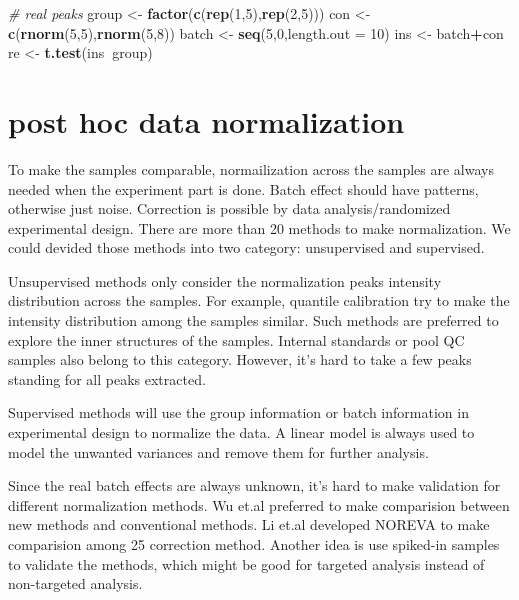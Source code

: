 \documentclass[
]{book}
\newenvironment{Shaded}{\begin{snugshade}}{\end{snugshade}}
\newcommand{\CommentTok}[1]{\textcolor[rgb]{0.56,0.35,0.01}{\textit{#1}}}
\newcommand{\DataTypeTok}[1]{\textcolor[rgb]{0.13,0.29,0.53}{#1}}
\newcommand{\DecValTok}[1]{\textcolor[rgb]{0.00,0.00,0.81}{#1}}
\newcommand{\KeywordTok}[1]{\textcolor[rgb]{0.13,0.29,0.53}{\textbf{#1}}}
\newcommand{\NormalTok}[1]{#1}
\newcommand{\OperatorTok}[1]{\textcolor[rgb]{0.81,0.36,0.00}{\textbf{#1}}}
\newcommand{\StringTok}[1]{\textcolor[rgb]{0.31,0.60,0.02}{#1}}
\begin{document}
\begin{Shaded}
\begin{Highlighting}[]
\CommentTok{# real peaks}
\NormalTok{group <-}\StringTok{ }\KeywordTok{factor}\NormalTok{(}\KeywordTok{c}\NormalTok{(}\KeywordTok{rep}\NormalTok{(}\DecValTok{1}\NormalTok{,}\DecValTok{5}\NormalTok{),}\KeywordTok{rep}\NormalTok{(}\DecValTok{2}\NormalTok{,}\DecValTok{5}\NormalTok{)))}
\NormalTok{con <-}\StringTok{ }\KeywordTok{c}\NormalTok{(}\KeywordTok{rnorm}\NormalTok{(}\DecValTok{5}\NormalTok{,}\DecValTok{5}\NormalTok{),}\KeywordTok{rnorm}\NormalTok{(}\DecValTok{5}\NormalTok{,}\DecValTok{8}\NormalTok{))}
\NormalTok{batch <-}\StringTok{ }\KeywordTok{seq}\NormalTok{(}\DecValTok{5}\NormalTok{,}\DecValTok{0}\NormalTok{,}\DataTypeTok{length.out =} \DecValTok{10}\NormalTok{)}
\NormalTok{ins <-}\StringTok{ }\NormalTok{batch}\OperatorTok{+}\NormalTok{con}
\NormalTok{re <-}\StringTok{ }\KeywordTok{t.test}\NormalTok{(ins}\OperatorTok{~}\NormalTok{group)}
\end{Highlighting}
\end{Shaded}

\hypertarget{post-hoc-data-normalization}{%
\section{post hoc data normalization}\label{post-hoc-data-normalization}}

To make the samples comparable, normailization across the samples are always needed when the experiment part is done. Batch effect should have patterns, otherwise just noise. Correction is possible by data analysis/randomized experimental design. There are more than 20 methods to make normalization. We could devided those methods into two category: unsupervised and supervised.

Unsupervised methods only consider the normalization peaks intensity distribution across the samples. For example, quantile calibration try to make the intensity distribution among the samples similar. Such methods are preferred to explore the inner structures of the samples. Internal standards or pool QC samples also belong to this category. However, it's hard to take a few peaks standing for all peaks extracted.

Supervised methods will use the group information or batch information in experimental design to normalize the data. A linear model is always used to model the unwanted variances and remove them for further analysis.

Since the real batch effects are always unknown, it's hard to make validation for different normalization methods. Wu et.al preferred to make comparision between new methods and conventional methods\citep{wu2016}. Li et.al developed NOREVA to make comparision among 25 correction method\citep{li2017a}. Another idea is use spiked-in samples to validate the methods\citep{franceschi2012}, which might be good for targeted analysis instead of non-targeted analysis.
\end{document}
